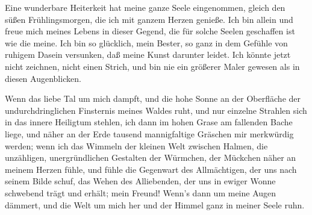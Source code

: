 






Eine wunderbare Heiterkeit hat meine ganze Seele eingenommen, gleich den süßen Frühlingsmorgen, die ich mit ganzem Herzen genieße. Ich bin allein und freue mich meines Lebens in dieser Gegend, die für solche Seelen geschaffen ist wie die meine. Ich bin so glücklich, mein Bester, so ganz in dem Gefühle von ruhigem Dasein versunken, daß meine Kunst darunter leidet. Ich könnte jetzt nicht zeichnen, nicht einen Strich, und bin nie ein größerer Maler gewesen als in diesen Augenblicken.

Wenn das liebe Tal um mich dampft, und die hohe Sonne an der Oberfläche der undurchdringlichen Finsternis meines Waldes ruht, und nur einzelne Strahlen sich in das innere Heiligtum stehlen, ich dann im hohen Grase am fallenden Bache liege, und näher an der Erde tausend mannigfaltige Gräschen mir merkwürdig werden; wenn ich das Wimmeln der kleinen Welt zwischen Halmen, die unzähligen, unergründlichen Gestalten der Würmchen, der Mückchen näher an meinem Herzen fühle, und fühle die Gegenwart des Allmächtigen, der uns nach seinem Bilde schuf, das Wehen des Alliebenden, der uns in ewiger Wonne schwebend trägt und erhält; mein Freund! Wenn's dann um meine Augen dämmert, und die Welt um mich her und der Himmel ganz in meiner Seele ruhn.
